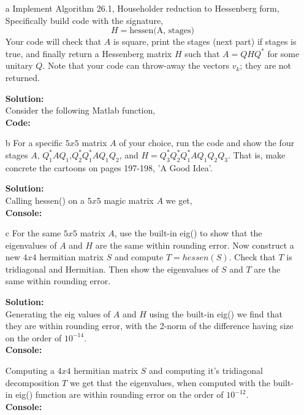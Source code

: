 \documentclass[12pt]{article}
\makeatletter
\theoremstyle{homework}
\newenvironment{exercise}[1]
{\def\@currentlabel{#1}\exercisecore}
{\endexercisecore}
\newcommand{\localhead}[1]{\par\smallskip\noindent\textbf{#1}\nobreak\\}%
\newcommand\solution{\localhead{Solution:}}
\makeatother
\begin{document}
\begin{exercise}{6}
  \begin{enumerate}
    \item[a] Implement Algorithm 26.1, Householder reduction to Hessenberg form, Specifically build code with the signature, 
    \begin{equation*}
      H = \text{hessen(A, stages)}
    \end{equation*} 
    Your code will check that $A$ is square, print the stages (next part) if stages is true, and finally return a Hessenberg matrix $H$ 
    such that $A = QHQ^*$ for some unitary $Q$. Note that your code can throw-away the vectors $v_k$; they are not returned. \\
    \solution Consider the following Matlab function,\\
    \textbf{Code:}
    \begin{center}
    
    \end{center} 
    \vspace{.15in}


    \item[b] For a specific $5x5$ matrix $A$ of your choice, run the code and show the four stages 
    $A$, $Q^*_1AQ_1$,$Q^*_2Q^*_1AQ_1Q_2$, and $H = Q^*_3Q^*_2Q^*_1AQ_1Q_2Q_3$. That is, make concrete the cartoons on pages 197-198, 
    'A Good Idea'. \\
    \solution Calling hessen() on a $5 x 5$ magic matrix $A$ we get,\\ 
    \textbf{Console:}
    \begin{center}
    
    \end{center} 
    \vspace{.15in}

    \item[c] For the same $5x5$ matrix $A$, use the built-in eig() to show that the eigenvalues of $A$ and $H$ are the same within rounding error. 
    Now construct a new $4x4$ hermitian matrix $S$ and compute $T = hessen(S)$. Check that $T$ is tridiagonal and Hermitian. Then show the eigenvalues of $S$ 
    and $T$ are the same within rounding error. \\
    \solution Generating the eig values of $A$ and $H$ using the built-in eig() we find that they are within rounding error, with the 2-norm of the difference having size on the 
    order of $10^{-14}$.\\
    \textbf{Console:}
    \begin{center}
    
    \end{center} 
    Computing a $4x4$ hermitian matrix $S$ and computing it's tridiagonal decomposition $T$ we get that the eigenvalues, when computed with the built-in eig() function are within rounding error on the order of 
    $10^{-12}$.\\
    \textbf{Console:}
    \begin{center}
    
    \end{center}  
  \end{enumerate}
\end{exercise}
\end{document}
